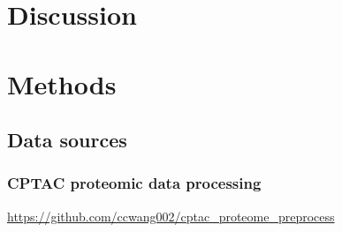 \section{Discussion}



\section{Methods}

\subsection{Data sources}
\subsubsection{CPTAC proteomic data processing}

 \url{https://github.com/ccwang002/cptac_proteome_preprocess}


